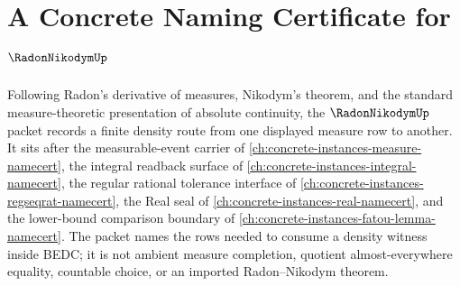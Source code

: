 \chapter{A Concrete Naming Certificate for $\RadonNikodymUp$}
\label{ch:concrete-instances-radon-nikodym-namecert}

Following Radon's derivative of measures, Nikodym's theorem, and the standard measure-theoretic presentation of absolute continuity, the $\RadonNikodymUp$ packet records a finite density route from one displayed measure row to another. It sits after the measurable-event carrier of \autoref{ch:concrete-instances-measure-namecert}, the integral readback surface of \autoref{ch:concrete-instances-integral-namecert}, the regular rational tolerance interface of \autoref{ch:concrete-instances-regseqrat-namecert}, the Real seal of \autoref{ch:concrete-instances-real-namecert}, and the lower-bound comparison boundary of \autoref{ch:concrete-instances-fatou-lemma-namecert}. The packet names the rows needed to consume a density witness inside BEDC; it is not ambient measure completion, quotient almost-everywhere equality, countable choice, or an imported Radon--Nikodym theorem.

